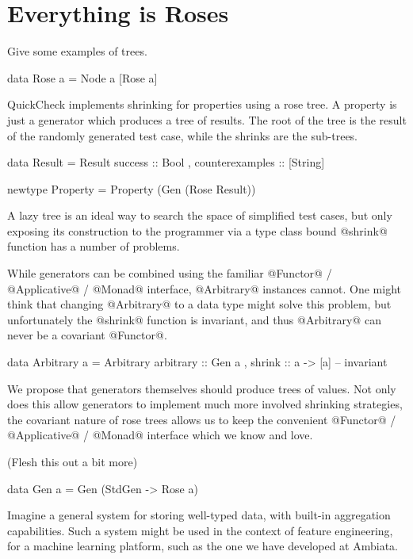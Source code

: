 \section{Everything is Roses}

Give some examples of trees.

\begin{code}
  data Rose a =
    Node a [Rose a]
\end{code}

QuickCheck implements shrinking for properties using a rose tree. A property is just a generator which produces a tree of results. The root of the tree is the result of the randomly generated test case, while the shrinks are the sub-trees.

\begin{code}
  data Result =
    Result {
        success         :: Bool
      , counterexamples :: [String]
      }

  newtype Property =
    Property (Gen (Rose Result))
\end{code}

A lazy tree is an ideal way to search the space of simplified test cases, but only exposing its construction to the programmer via a type class bound @shrink@ function has a number of problems.

While generators can be combined using the familiar @Functor@ / @Applicative@ / @Monad@ interface, @Arbitrary@ instances cannot. One might think that changing @Arbitrary@ to a data type might solve this problem, but unfortunately the @shrink@ function is invariant, and thus @Arbitrary@ can never be a covariant @Functor@.

\begin{code}
  data Arbitrary a =
    Arbitrary {
        arbitrary :: Gen a
      , shrink    :: a -> [a] -- invariant
      }
\end{code}

We propose that generators themselves should produce trees of values. Not only does this allow generators to implement much more involved shrinking strategies, the covariant nature of rose trees allows us to keep the convenient @Functor@ / @Applicative@ / @Monad@ interface which we know and love.

(Flesh this out a bit more)

\begin{code}
  data Gen a =
    Gen (StdGen -> Rose a)
\end{code}

Imagine a general system for storing well-typed data, with built-in aggregation capabilities. Such a system might be used in the context of feature engineering, for a machine learning platform, such as the one we have developed at Ambiata.

